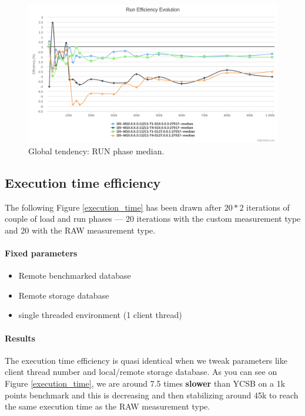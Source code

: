 \documentclass[a4paper,11pt]{report}
\begin{document}
\begin{figure}[ht]
\begin{center}
\includegraphics[width=1\linewidth]{images/evaluation/global-withoutMlocal-run.png}
\caption{Global tendency: RUN phase median.}
\label{global-withoutMlocal-run}
\end{center}
\end{figure}

\clearpage

\subsection{Execution time efficiency}

The following Figure \ref{execution_time} has been drawn after $20*2$ iterations of couple of load and run phases --- 20 iterations with the custom measurement type and 20 with the RAW measurement type.

\paragraph{Fixed parameters}
\begin{itemize}
\item
Remote benchmarked database
\item
Remote storage database
\item
single threaded environment (1 client thread)
\end{itemize}

\paragraph{Results}

The execution time efficiency is quasi identical when we tweak parameters like client thread number and local/remote storage database. As you can see on Figure \ref{execution_time}, we are around 7.5 times \textbf{slower} than YCSB on a 1k points benchmark and this is decreasing and then stabilizing around 45k to reach the same execution time as the RAW measurement type.
\end{document}
